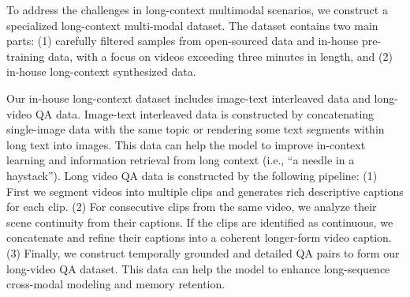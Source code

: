 \documentclass{article}
\begin{document}



To address the challenges in long-context multimodal scenarios, we construct a specialized long-context multi-modal dataset. The dataset contains two main parts: (1) carefully filtered samples from open-sourced data and in-house pre-training data, with a focus on videos exceeding three minutes in length, and (2) in-house long-context synthesized data.

Our in-house long-context dataset includes image-text interleaved data and long-video QA data.
Image-text interleaved data is constructed by concatenating single-image data with the same topic or rendering some text segments within long text into images. This data can help the model to improve in-context learning and information retrieval from long context (i.e., ``a needle in a haystack'').
Long video QA data is constructed by the following pipeline: (1) First we segment videos into multiple clips and generates rich descriptive captions for each clip. (2) For consecutive clips from the same video, we analyze their scene continuity from their captions. If the clips are identified as continuous, we concatenate and refine their captions into a coherent longer-form video caption. (3) Finally, we construct temporally grounded and detailed QA pairs to form our long-video QA dataset.
This data can help the model to enhance long-sequence cross-modal modeling and memory retention.
\end{document}
